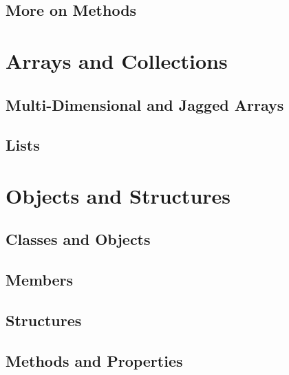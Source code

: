 \documentclass[
]{book}
\begin{document}
\hypertarget{more-on-methods}{%
\section{More on Methods}\label{more-on-methods}}

\hypertarget{arrays-and-collections}{%
\chapter{Arrays and Collections}\label{arrays-and-collections}}

\hypertarget{multi-dimensional-and-jagged-arrays}{%
\section{Multi-Dimensional and Jagged Arrays}\label{multi-dimensional-and-jagged-arrays}}

\hypertarget{lists}{%
\section{Lists}\label{lists}}

\hypertarget{objects-and-structures}{%
\chapter{Objects and Structures}\label{objects-and-structures}}

\hypertarget{classes-and-objects}{%
\section{Classes and Objects}\label{classes-and-objects}}

\hypertarget{members}{%
\section{Members}\label{members}}

\hypertarget{structures}{%
\section{Structures}\label{structures}}

\hypertarget{methods-and-properties}{%
\section{Methods and Properties}\label{methods-and-properties}}
\end{document}
